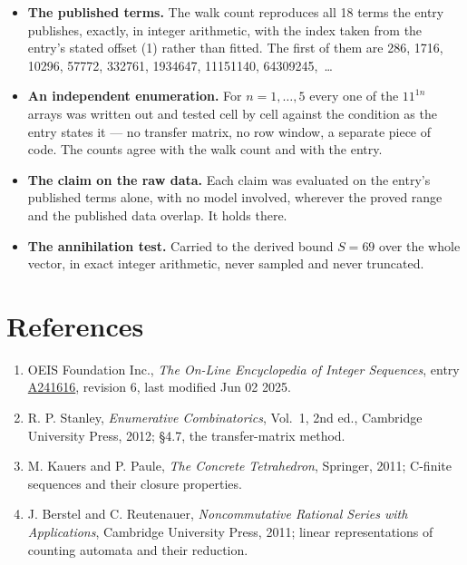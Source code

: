 \documentclass[11pt]{article}
\theoremstyle{definition}
\begin{document}
\begin{itemize}

\item {\bfseries The published terms.} The walk count reproduces all 18 terms the entry publishes, exactly, in integer arithmetic, with the index taken from the entry's stated offset (1) rather than fitted. The first of them are 286, 1716, 10296, 57772, 332761, 1934647, 11151140, 64309245,~\dots

\item {\bfseries An independent enumeration.} For $n = 1,\dots,5$ every one of the $11^{1n}$ arrays was written out and tested cell by cell against the condition as the entry states it --- no transfer matrix, no row window, a separate piece of code. The counts agree with the walk count and with the entry.

\item {\bfseries The claim on the raw data.} Each claim was evaluated on the entry's published terms alone, with no model involved, wherever the proved range and the published data overlap. It holds there.

\item {\bfseries The annihilation test.} Carried to the derived bound $S = 69$ over the whole vector, in exact integer arithmetic, never sampled and never truncated.

\end{itemize}

\section{References}

\begin{enumerate}

\item OEIS Foundation Inc., \emph{The On-Line Encyclopedia of Integer Sequences}, entry \href{https://oeis.org/A241616}{A241616}, revision 6, last modified Jun 02 2025.

\item R. P. Stanley, \emph{Enumerative Combinatorics}, Vol.~1, 2nd ed., Cambridge University Press, 2012; \S4.7, the transfer-matrix method.

\item M. Kauers and P. Paule, \emph{The Concrete Tetrahedron}, Springer, 2011; C-finite sequences and their closure properties.

\item J. Berstel and C. Reutenauer, \emph{Noncommutative Rational Series with Applications}, Cambridge University Press, 2011; linear representations of counting automata and their reduction.

\end{enumerate}
\end{document}
